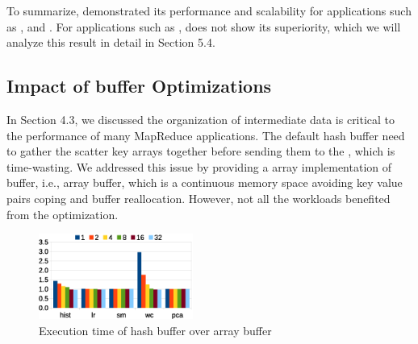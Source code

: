 To summarize, \myds demonstrated its performance and scalability for applications such as ,  and .
For applications such as , \myds does not show its superiority, which we will analyze this result in detail in Section 5.4.

\subsection{ Impact of buffer Optimizations}
In Section 4.3, we discussed the organization of intermediate data is critical to the performance of many MapReduce applications.
The default hash buffer need to gather the scatter key arrays together before sending them to the , which is time-wasting.
We addressed this issue by providing a array implementation of buffer, i.e., array buffer, which is a continuous memory space avoiding key value pairs coping and buffer reallocation.
However, not all the workloads benefited from the optimization.

\begin{figure}[!h!t]  
	\centering
	\includegraphics[width=0.45\textwidth]{eps/smr_diff_buffer.eps}
	\caption{Execution time of hash buffer over array buffer}
	\label{fig:smr:diff:buffer}
\end{figure}


